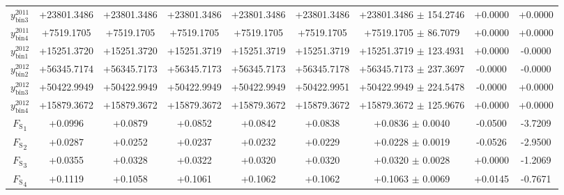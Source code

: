 \begin{landscape}
\begin{table}[h!]
\begin{tabular}{c|c|c|c|c|c|c|c|c}
    $y_{\text{bin}3}^{2011}$           & +23801.3486  & +23801.3486  & +23801.3486  & +23801.3486  & +23801.3486  & +23801.3486 $\pm$ 154.2746 & +0.0000 & +0.0000 \\
    $y_{\text{bin}4}^{2011}$           & +7519.1705  & +7519.1705  & +7519.1705  & +7519.1705  & +7519.1705  & +7519.1705 $\pm$ 86.7079 & +0.0000 & +0.0000 \\
    $y_{\text{bin}1}^{2012}$           & +15251.3720  & +15251.3720  & +15251.3719  & +15251.3719  & +15251.3719  & +15251.3719 $\pm$ 123.4931 & +0.0000 & -0.0000 \\
    $y_{\text{bin}2}^{2012}$           & +56345.7174  & +56345.7173  & +56345.7173  & +56345.7173  & +56345.7178  & +56345.7173 $\pm$ 237.3697 & -0.0000 & -0.0000 \\
    $y_{\text{bin}3}^{2012}$           & +50422.9949  & +50422.9949  & +50422.9949  & +50422.9949  & +50422.9951  & +50422.9949 $\pm$ 224.5478 & -0.0000 & +0.0000 \\
    $y_{\text{bin}4}^{2012}$           & +15879.3672  & +15879.3672  & +15879.3672  & +15879.3672  & +15879.3672  & +15879.3672 $\pm$ 125.9676 & +0.0000 & +0.0000 \\
    ${F_\text{S}}_1$                   & +0.0996  & +0.0879  & +0.0852  & +0.0842  & +0.0838  & +0.0836 $\pm$ 0.0040 & -0.0500 & -3.7209 \\
    ${F_\text{S}}_2$                   & +0.0287  & +0.0252  & +0.0237  & +0.0232  & +0.0229  & +0.0228 $\pm$ 0.0019 & -0.0526 & -2.9500 \\
    ${F_\text{S}}_3$                   & +0.0355  & +0.0328  & +0.0322  & +0.0320  & +0.0320  & +0.0320 $\pm$ 0.0028 & +0.0000 & -1.2069 \\
    ${F_\text{S}}_4$                   & +0.1119  & +0.1058  & +0.1061  & +0.1062  & +0.1062  & +0.1063 $\pm$ 0.0069 & +0.0145 & -0.7671 \\
  \end{tabular}
\end{table}
\end{landscape}
\clearpage

